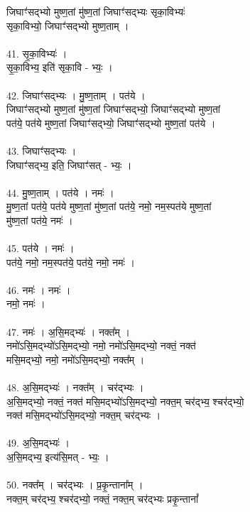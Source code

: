 जिघाꣳ॑सद्भ्यो मुष्ण॒तां मु॑ष्ण॒तां जिघाꣳ॑सद्भ्यः सृका॒विभ्यः॑\\
सृका॒विभ्यो॒ जिघाꣳ॑सद्भ्यो मुष्ण॒ताम् ।\\
\\
41. सृ॒का॒विभ्यः॑ ।\\
सृ॒का॒विभ्य॒ इति॑ सृका॒वि - भ्यः॒ ।\\
\\
42. जिघाꣳ॑सद्भ्यः । मु॒ष्ण॒ताम् । पत॑ये ।\\
जिघाꣳ॑सद्भ्यो मुष्ण॒तां मु॑ष्ण॒तां जिघाꣳ॑सद्भ्यो॒ जिघाꣳ॑सद्भ्यो मुष्ण॒तां\\
पत॑ये॒ पत॑ये मुष्ण॒तां जिघाꣳ॑सद्भ्यो॒ जिघाꣳ॑सद्भ्यो मुष्ण॒तां पत॑ये ।\\
\\
43. जिघाꣳ॑सद्भ्यः ।\\
जिघाꣳ॑सद्भ्य॒ इति॒ जिघाꣳ॑सत् - भ्यः॒ ।\\
\\
44. मु॒ष्ण॒ताम् । पत॑ये । नमः॑ ।\\
मु॒ष्ण॒तां पत॑ये॒ पत॑ये मुष्ण॒तां मु॑ष्ण॒तां पत॑ये॒ नमो॒ नम॒स्पत॑ये मुष्ण॒तां\\
मु॑ष्ण॒तां पत॑ये॒ नमः॑ ।\\
\\
45. पत॑ये । नमः॑ ।\\
पत॑ये॒ नमो॒ नम॒स्पत॑ये॒ पत॑ये॒ नमो॒ नमः॑ ।\\
\\
46. नमः॑ । नमः॑ ।\\
नमो॒ नमः॑ ।\\
\\
47. नमः॑ । अ॒सि॒मद्भ्यः॑ । नक्त᳚म् ।\\
नमो॑ऽसि॒मद्भ्यो॑ऽसि॒मद्भ्यो॒ नमो॒ नमो॑ऽसि॒मद्भ्यो॒ नक्तं॒ नक्त॑\\
मसि॒मद्भ्यो॒ नमो॒ नमो॑ऽसि॒मद्भ्यो॒ नक्त᳚म् ।\\
\\
48. अ॒सि॒मद्भ्यः॑ । नक्त᳚म् । चर॑द्भ्यः ।\\
अ॒सि॒मद्भ्यो॒ नक्तं॒ नक्त॑ मसि॒मद्भ्यो॑ऽसि॒मद्भ्यो॒ नक्त॒म् चर॑द्भ्य॒ श्चर॑द्भ्यो॒\\
नक्त॑ मसि॒मद्भ्यो॑ऽसि॒मद्भ्यो॒ नक्त॒म् चर॑द्भ्यः ।\\
\\
49. अ॒सि॒मद्भ्यः॑ ।\\
अ॒सि॒मद्भ्य॒ इत्य॑सि॒मत् - भ्यः॒ ।\\
\\
50. नक्त᳚म् । चर॑द्भ्यः । प्र॒कृ॒न्ताना᳚म् ।\\
नक्त॒म् चर॑द्भ्य॒ श्चर॑द्भ्यो॒ नक्तं॒ नक्त॒म् चर॑द्भ्यः प्रकृ॒न्तानां᳚\\
